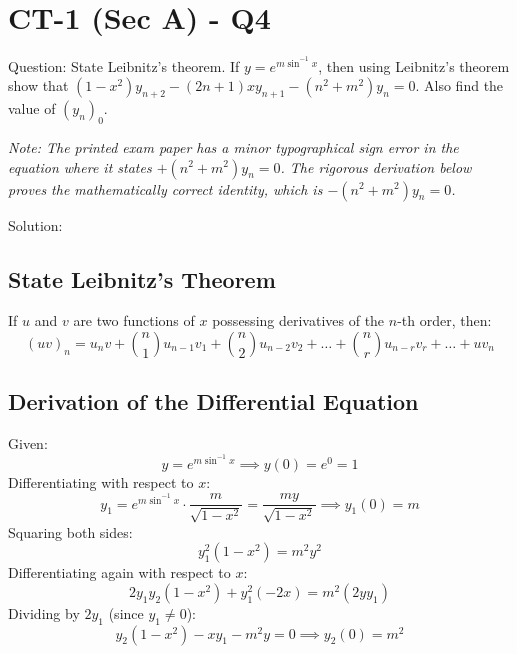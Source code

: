 \documentclass[11pt, a4paper]{article}
\begin{document}

\section*{CT-1 (Sec A) - Q4}

Question:
State Leibnitz's theorem. If $y = e^{m\sin^{-1}x}$, then using Leibnitz's theorem show that $(1-x^2)y_{n+2} - (2n+1)xy_{n+1} - (n^2 + m^2)y_n = 0$. Also find the value of $(y_n)_0$.

\textit{Note: The printed exam paper has a minor typographical sign error in the equation where it states $+ (n^2+m^2)y_n = 0$. The rigorous derivation below proves the mathematically correct identity, which is $- (n^2 + m^2)y_n = 0$.}

Solution:

\subsection*{State Leibnitz's Theorem}
If $u$ and $v$ are two functions of $x$ possessing derivatives of the $n$-th order, then:
\[ (uv)_n = u_n v + \binom{n}{1} u_{n-1} v_1 + \binom{n}{2} u_{n-2} v_2 + \dots + \binom{n}{r} u_{n-r} v_r + \dots + u v_n \]

\subsection*{Derivation of the Differential Equation}
Given:
\[ y = e^{m\sin^{-1}x} \implies y(0) = e^0 = 1 \]
Differentiating with respect to $x$:
\[ y_1 = e^{m\sin^{-1}x} \cdot \frac{m}{\sqrt{1-x^2}} = \frac{my}{\sqrt{1-x^2}} \implies y_1(0) = m \]
Squaring both sides:
\[ y_1^2 (1-x^2) = m^2 y^2 \]
Differentiating again with respect to $x$:
\[ 2y_1 y_2 (1-x^2) + y_1^2 (-2x) = m^2 (2y y_1) \]
Dividing by $2y_1$ (since $y_1 \neq 0$):
\[ y_2(1-x^2) - xy_1 - m^2 y = 0 \implies y_2(0) = m^2 \]
\end{document}
